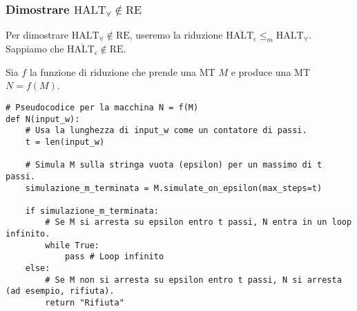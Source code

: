 \documentclass[a4paper]{article}
\begin{document}
\subsubsection{Dimostrare $\text{HALT}_\forall \notin \text{RE}$}
Per dimostrare $\text{HALT}_\forall \notin \text{RE}$, useremo la riduzione $\overline{\text{HALT}_\epsilon} \le_m \text{HALT}_\forall$.
Sappiamo che $\overline{\text{HALT}_\epsilon} \notin \text{RE}$.

Sia $f$ la funzione di riduzione che prende una MT $M$ e produce una MT $N = f(M)$.
\begin{verbatim}
# Pseudocodice per la macchina N = f(M)
def N(input_w):
    # Usa la lunghezza di input_w come un contatore di passi.
    t = len(input_w)
    
    # Simula M sulla stringa vuota (epsilon) per un massimo di t passi.
    simulazione_m_terminata = M.simulate_on_epsilon(max_steps=t)
    
    if simulazione_m_terminata:
        # Se M si arresta su epsilon entro t passi, N entra in un loop infinito.
        while True:
            pass # Loop infinito
    else:
        # Se M non si arresta su epsilon entro t passi, N si arresta (ad esempio, rifiuta).
        return "Rifiuta"
\end{verbatim}
\end{document}
